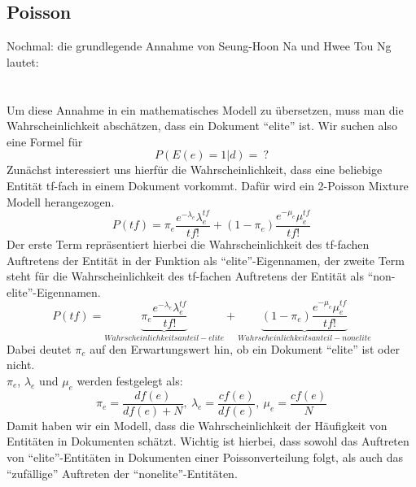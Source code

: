 \subsection{Poisson}
Nochmal: die grundlegende Annahme von Seung-Hoon Na und Hwee Tou Ng lautet:\\
\\
\\
Um diese Annahme in ein mathematisches Modell zu übersetzen, muss man die Wahrscheinlichkeit abschätzen, dass ein Dokument ``elite'' ist. Wir suchen also eine Formel für
\[P\left( E\left( e \right)=1|d \right)=\ ?\]
Zunächst interessiert uns hierfür die Wahrscheinlichkeit, dass eine beliebige Entität tf-fach in einem Dokument vorkommt. Dafür wird ein 2-Poisson Mixture Modell herangezogen.
\[P\left( tf \right)=\pi_e\frac{e^{-\lambda_e}\lambda_{e}^{ tf }}{tf!}+\left( 1-\pi_e \right)\frac{e^{-\mu_e} \mu_e^{tf}}{tf!}\]
Der erste Term repräsentiert hierbei die Wahrscheinlichkeit des tf-fachen Auftretens der Entität in der Funktion als ``elite''-Eigennamen, der zweite Term steht für die Wahrscheinlichkeit des tf-fachen Auftretens der Entität als ``non-elite''-Eigennamen.
\[P\left( tf \right)=\underbrace{\pi_e\frac{e^{-\lambda_e}\lambda_{e}^{ tf }}{tf!}}_{Wahrscheinlichkeitsanteil - elite} +\underbrace{\left( 1-\pi_e \right)\frac{e^{-\mu_e} \mu_e^{tf}}{tf!}}_{Wahrscheinlichkeitsanteil - nonelite}\]
Dabei deutet $\pi_e$ auf den Erwartungswert hin, ob ein Dokument ``elite'' ist oder nicht.\\
$\pi_e$, $\lambda_e$ und $\mu_e$ werden festgelegt als:
\[\pi_e=\frac{df\left( e \right)}{df\left( e \right)+N}, \ \lambda_e=\frac{cf\left( e \right)}{df\left( e \right)}, \ \mu_e=\frac{cf(e)}{N}\]
Damit haben wir ein Modell, dass die Wahrscheinlichkeit der Häufigkeit von Entitäten in Dokumenten schätzt. Wichtig ist hierbei, dass sowohl das Auftreten von ``elite''-Entitäten in Dokumenten einer Poissonverteilung folgt, als auch das ``zufällige'' Auftreten der ``nonelite''-Entitäten.\\


